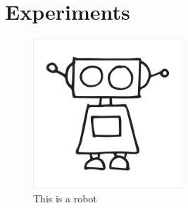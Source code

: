\chapter{Experiments}

\lipsum[1-3]
\begin{figure}
    \centering
    \includegraphics[width=0.5\textwidth]{figures/robot.jpg}
    \caption{This is a robot}
    \label{fig:robot}
\end{figure}

\lipsum[4-5]